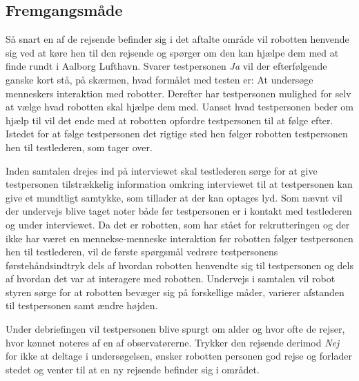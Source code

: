 \subsection*{Fremgangsmåde}
\label{Fremgangsmaade}
%
Så snart en af de rejsende befinder sig i det aftalte område vil robotten henvende sig ved at køre hen til den rejsende og spørger om den kan hjælpe dem med at finde rundt i Aalborg Lufthavn. Svarer testpersonen \textit{Ja} vil der efterfølgende ganske kort stå, på skærmen, hvad formålet med testen er: At undersøge menneskers interaktion med robotter. Derefter har testpersonen mulighed for selv at vælge hvad robotten skal hjælpe dem med. Uanset hvad testpersonen beder om hjælp til vil det ende med at robotten opfordre testpersonen til at følge efter. Istedet for at følge testpersonen det rigtige sted hen følger robotten testpersonen hen til testlederen, som tager over. 

Inden samtalen drejes ind på interviewet skal testlederen sørge for at give testpersonen tilstrækkelig information omkring interviewet til at testpersonen kan give et mundtligt samtykke, som tillader at der kan optages lyd. Som nævnt vil der undervejs blive taget noter både før testpersonen er i kontakt med testlederen og under interviewet. \blankline
%
Da det er robotten, som har stået for rekrutteringen og der ikke har været en mennekse-menneske interaktion før robotten følger testpersonen hen til testlederen, vil de første spørgsmål vedrøre testpersonens førstehåndsindtryk dels af hvordan robotten henvendte sig til testpersonen og dels af hvordan det var at interagere med robotten. Undervejs i samtalen vil robot styren sørge for at robotten bevæger sig på forskellige måder, varierer afstanden til testpersonen samt ændre højden.  

Under debriefingen vil testpersonen blive spurgt om alder og hvor ofte de rejser, hvor kønnet noteres af en af observatørerne.\blankline      
%
Trykker den rejsende derimod \textit{Nej} for ikke at deltage i undersøgelsen, ønsker robotten personen god rejse og forlader stedet og venter til at en ny rejsende befinder sig i området.



     
